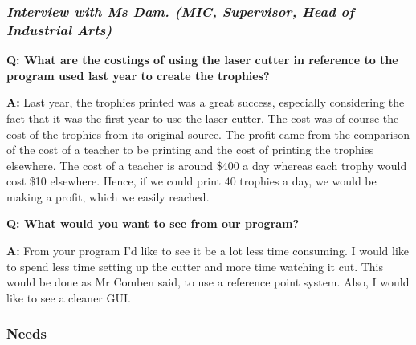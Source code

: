 \documentclass[oneside,openany,11pt,a4paper]{report}
\newenvironment{qanda}{\setlength{\parindent}{0pt}}{\bigskip}
\newcommand{\Q}{\bigskip\bfseries Q: }
\newcommand{\A}{\par\textbf{A:} \normalfont}
\begin{document}
\subsubsection{\textit{Interview with Ms Dam. (MIC, Supervisor, Head of Industrial Arts)}}
\begin{qanda}
\Q What are the costings of using the laser cutter in reference to the program used last year to create the trophies?
\A Last year, the trophies printed was a great success, especially considering the fact that it was the first year to use the laser cutter. The cost was of course the cost of the trophies from its original source. The profit came from the comparison of the cost of a teacher to be printing and the cost of printing the trophies elsewhere. The cost of a teacher is around \$400 a day whereas each trophy would cost \$10 elsewhere. Hence, if we could print 40 trophies a day, we would be making a profit, which we easily reached.

\Q What would you want to see from our program?
\A From your program I’d like to see it be a lot less time consuming. I would like to spend less time setting up the cutter and more time watching it cut. This would be done as Mr Comben said, to use a reference point system. Also, I would like to see a cleaner GUI.
\end{qanda}

\subsubsection{Needs}
\end{document}
